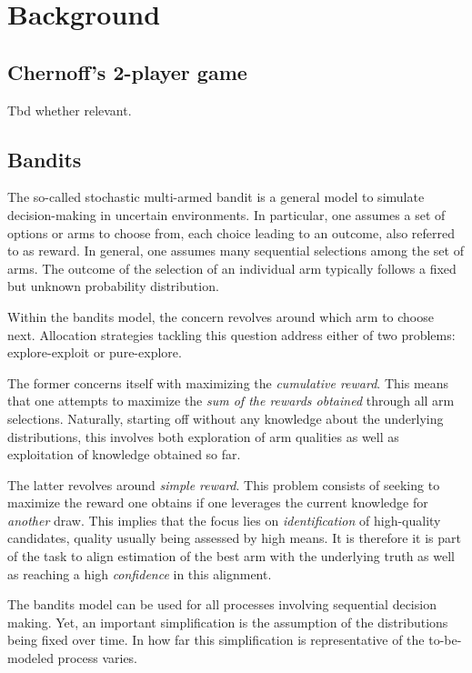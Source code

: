\chapter{Background}

\section{Chernoff's 2-player game}
Tbd whether relevant.

\section{Bandits}
The so-called stochastic multi-armed bandit is a general model to simulate decision-making in uncertain environments.
In particular, one assumes a set of options or arms to choose from, each choice leading to an outcome, also referred to as reward. In general, one assumes many sequential selections among the set of arms. The outcome of the selection of an individual arm typically follows a fixed but unknown probability distribution.

Within the bandits model, the concern revolves around which arm to choose next. Allocation strategies tackling this question address either of two problems: explore-exploit or pure-explore.

The former concerns itself with maximizing the \emph{cumulative reward}. This means that one attempts to maximize the \emph{sum of the rewards obtained} through all arm selections. Naturally, starting off without any knowledge about the underlying distributions, this involves both exploration of arm qualities as well as exploitation of knowledge obtained so far.

The latter revolves around \emph{simple reward}. This problem consists of seeking to maximize the reward one obtains if one leverages the current knowledge for \emph{another} draw. This implies that the focus lies on \emph{identification} of high-quality candidates, quality usually being assessed by high means. It is therefore it is part of the task to align estimation of the best arm with the underlying truth as well as reaching a high \emph{confidence} in this alignment.

The bandits model can be used for all processes involving sequential decision making. Yet, an important simplification is the assumption of the distributions being fixed over time. In how far this simplification is representative of the to-be-modeled process varies.

